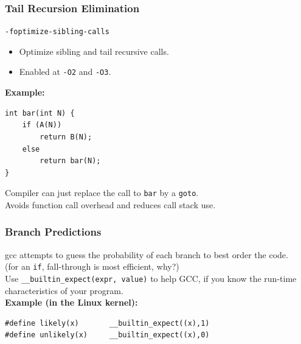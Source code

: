 \documentclass[aspectratio=43]{beamer}
\newenvironment{changemargin}[1]{%
  \begin{list}{}{%
    \setlength{\topsep}{0pt}%
    \setlength{\leftmargin}{#1}%
    \setlength{\rightmargin}{1em}
    \setlength{\listparindent}{\parindent}%
    \setlength{\itemindent}{\parindent}%
    \setlength{\parsep}{\parskip}%
  }%
  \item[]}{\end{list}}
\begin{document}
\begin{frame}[fragile]
  \frametitle{Tail Recursion Elimination}

  \begin{changemargin}{2cm}

  {\tt -foptimize-sibling-calls}

  \begin{itemize}
    \item Optimize sibling and tail recursive calls.
    \item Enabled at {\tt -O2} and {\tt -O3}.
  \end{itemize}

  {\bf Example:}

  \begin{lstlisting}
int bar(int N) {
    if (A(N))
        return B(N);
    else
        return bar(N);
}
  \end{lstlisting}

  Compiler can just replace the call to {\tt bar} by a {\tt goto}.\\
  Avoids function call overhead 
  and reduces call stack use.
  \end{changemargin}
\end{frame}

\begin{frame}[fragile]
  \frametitle{Branch Predictions}

  \begin{changemargin}{2cm}
     gcc attempts to guess the probability of each branch to 
      best order the code.\\
     (for an {\tt if}, fall-through is most efficient, why?)\\[1em]

     Use {\tt \_\_builtin\_expect(expr, value)} to help GCC, if
      you know the run-time characteristics of your program.\\[1em]
  {\bf Example (in the Linux kernel):}

  \begin{lstlisting}
#define likely(x)       __builtin_expect((x),1)
#define unlikely(x)     __builtin_expect((x),0)
  \end{lstlisting}
  \end{changemargin}
\end{frame}
\end{document}

